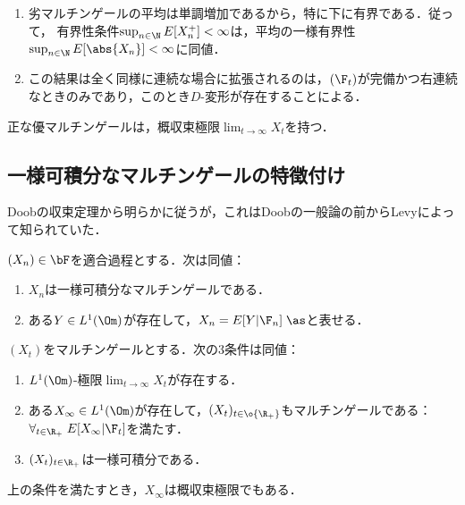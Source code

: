 \documentclass[uplatex,dvipdfmx]{jsreport}
\begin{document}
\begin{remarks}\mbox{}
    \begin{enumerate}
        \item 劣マルチンゲールの平均は単調増加であるから，特に下に有界である．従って，
        有界性条件$\sup_{n\in\N}E[X_n^+]<\infty$は，平均の一様有界性$\sup_{n\in\N}E[\abs{X_n}]<\infty$に同値．
        \item この結果は全く同様に連続な場合に拡張されるのは，$(\F_t)$が完備かつ右連続なときのみであり，このとき$D$-変形が存在することによる．
    \end{enumerate}
\end{remarks}

\begin{corollary}
    正な優マルチンゲールは，概収束極限$\lim_{t\to\infty}X_t$を持つ．
\end{corollary}

\subsection{一様可積分なマルチンゲールの特徴付け}

\begin{tcolorbox}[colframe=ForestGreen, colback=ForestGreen!10!white,breakable,colbacktitle=ForestGreen!40!white,coltitle=black,fonttitle=\bfseries\sffamily,
title=]
    Doobの収束定理から明らかに従うが，これはDoobの一般論の前からLevyによって知られていた．
\end{tcolorbox}

\begin{corollary}[Levy]
    $(X_n)\in\bF$を適合過程とする．次は同値：
    \begin{enumerate}
        \item $X_n$は一様可積分なマルチンゲールである．
        \item ある$Y\in L^1(\Om)$が存在して，$X_n=E[Y|\F_n]\;\as$と表せる．
    \end{enumerate}
\end{corollary}

\begin{theorem}
    $(X_t)$をマルチンゲールとする．次の3条件は同値：
    \begin{enumerate}
        \item $L^1(\Om)$-極限$\lim_{t\to\infty}X_t$が存在する．
        \item ある$X_\infty\in L^1(\Om)$が存在して，$(X_t)_{t\in\o{\R_+}}$もマルチンゲールである：$\forall_{t\in\R_+}\;E[X_\infty|\F_t]$を満たす．
        \item $(X_t)_{t\in\R_+}$は一様可積分である．
    \end{enumerate}
    上の条件を満たすとき，$X_\infty$は概収束極限でもある．
\end{theorem}
\end{document}
